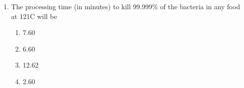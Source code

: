 \documentclass[a4paper,10pt]{article}
\begin{document}
\begin{enumerate}
\item The processing time (in minutes) to kill 99.999\% of the bacteria in any food at 121\degree C will be
\hfill{}

\begin{multicols}{4}
\begin{enumerate}
\item 7.60
\item 6.60
\item 12.62
\item 2.60
\end{enumerate}
\end{multicols}
\end{enumerate}
\end{document}
